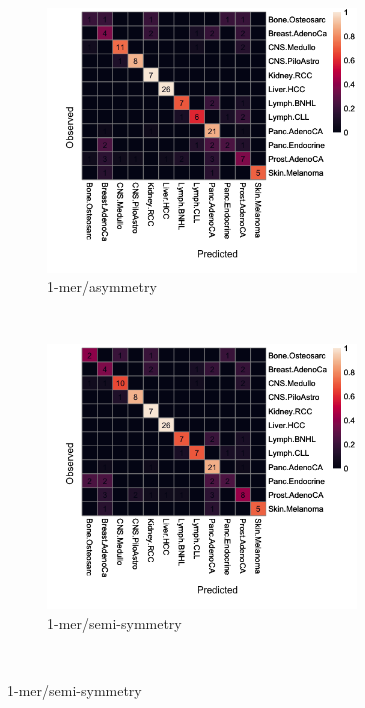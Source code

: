 \begin{figure}[ht!]
    \begin{subfigure}{.5\textwidth}
    \centering
    \includegraphics[width=0.9\textwidth,height=0.8\textwidth]{graphics/confusion_matrix_1mer.png}
    \caption{1-mer/asymmetry}
    \label{fig:confusion_1mer}
    \end{subfigure}
    ~
    \begin{subfigure}{.5\textwidth}
    \centering
    \includegraphics[width=0.9\textwidth,height=0.8\textwidth]{graphics/confusion_matrix_symmetric_1mer.png}
    \caption{1-mer/semi-symmetry}
    \label{fig:confusion_1mer_symmetric}
    \end{subfigure} \\
    \vspace{0.1cm}
    

\end{figure}

